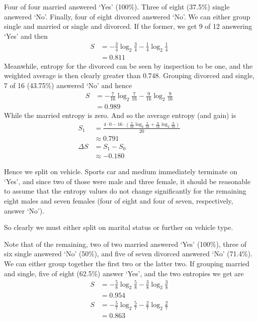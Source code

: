 \documentclass{article}
\begin{document}
	\par 
	Four of four married answered `Yes' (100\%). Three of eight (37.5\%) single answered `No'. Finally, four of eight divorced answered `No'. We can either group single and married or single and divorced. If the former, we get 9 of 12 answering `Yes' and then
	\begin{align*}
		S &= -\frac{3}{4}\log_2\frac{3}{4}-\frac{1}{4}\log_2\frac{1}{4}\\
		&= 0.811
	\end{align*}
	Meanwhile, entropy for the divorced can be seen by inspection to be one, and the weighted average is then clearly greater than $0.748$. Grouping divorced and single, 7 of 16 (43.75\%) answered `No' and hence
	\begin{align*}
		S &= -\frac{7}{16}\log_2\frac{7}{16} - \frac{9}{16}\log_2\frac{9}{16}\\
		&= 0.989
	\end{align*}
	While the married entropy is zero. And so the average entropy (and gain) is
	\begin{align*}
		S_1 &= \frac{4\cdot 0 - 16\cdot\left(\frac{7}{16}\log_2\frac{7}{16} + \frac{9}{16}\log_2\frac{9}{16}\right)}{20}\\
		&\approx 0.791\\
		\Delta S &= S_1 - S_0\\
		&\approx -0.180
	\end{align*}
	\par 
	Hence we split on vehicle. Sports car and medium immediately terminate on `Yes', and since two of those were male and three female, it should be reasonable to assume that the entropy values do not change significantly for the remaining eight males and seven females (four of eight and four of seven, respectively, answer `No').
	\par 
	So clearly we must either split on marital status or further on vehicle type.
	\par 
	Note that of the remaining, two of two married answered `Yes' (100\%), three of six single answered `No' (50\%), and five of seven divorced answered `No' (71.4\%). We can either group together the first two or the latter two. If grouping married and single, five of eight (62.5\%) answer `Yes', and the two entropies we get are
	\begin{align*}
		S &= -\frac{5}{8}\log_2\frac{5}{8}-\frac{3}{8}\log_2\frac{3}{8}\\
		&= 0.954\\
		S &= -\frac{5}{7}\log_2\frac{5}{7}-\frac{2}{7}\log_2\frac{2}{7}\\
		&= 0.863
	\end{align*}
\end{document}
